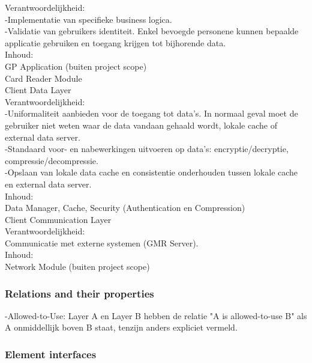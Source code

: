 \documentclass[a4paper,10pt]{article}
\begin{document}
Verantwoordelijkheid:\\
-Implementatie van specifieke business logica.\\
-Validatie van gebruikers identiteit. Enkel bevoegde personene kunnen bepaalde applicatie gebruiken en toegang krijgen tot bijhorende data.\\

Inhoud:\\
GP Application (buiten project scope)\\
Card Reader Module\\

Client Data Layer\\

Verantwoordelijkheid:\\
-Uniformaliteit aanbieden voor de toegang tot data's. In normaal geval moet de gebruiker niet weten waar de data vandaan gehaald wordt, lokale cache of external data server.\\
-Standaard voor- en nabewerkingen uitvoeren op data's: encryptie/decryptie, compressie/decompressie.\\
-Opslaan van lokale data cache en consistentie onderhouden tussen lokale cache en external data server.\\

Inhoud:\\
Data Manager, Cache, Security (Authentication en Compression)\\

Client Communication Layer\\

Verantwoordelijkheid:\\
Communicatie met externe systemen (GMR Server).\\

Inhoud:\\
Network Module (buiten project scope)\\


\subsubsection{Relations and their properties}

-Allowed-to-Use: Layer A en Layer B hebben de relatie "A is allowed-to-use B" als A onmiddellijk boven B staat, tenzijn anders expliciet vermeld.\\

\subsubsection{Element interfaces}
\end{document}

